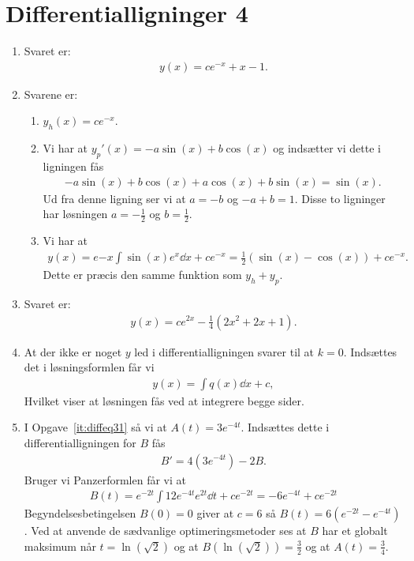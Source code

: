 \section{Differentialligninger 4}
\begin{enumerate}
	
	
	
	\item Svaret er:
	\begin{align*}
	y(x)=ce^{-x}+x-1.
	\end{align*}

	
	\item Svarene er:
	\begin{enumerate}
		\item $y_h(x)=ce^{-x}$.
		\item Vi har at $y_p'(x)=-a\sin(x)+b\cos(x)$ og indsætter vi dette i ligningen fås
		\begin{align*}
		-a\sin(x)+b\cos(x)+a\cos(x)+b\sin(x)=\sin(x).
		\end{align*} 
		Ud fra denne ligning ser vi at $a=-b$ og $-a+b=1$. Disse to ligninger har løsningen $a=-\frac{1}{2}$ og $b=\frac{1}{2}$.
		
		\item Vi har at 
		\begin{align*}
		y(x)=e{-x}\int \sin(x)e^x\dd x+ce^{-x}=\frac{1}{2}(\sin(x)-\cos(x))+ce^{-x}.
		\end{align*}
		Dette er præcis den samme funktion som $y_h+y_p$. 
	\end{enumerate}

	\item Svaret er:
	\begin{align*}
	y(x)=ce^{2x} -\frac{1}{4}(2x^2+2x+1).
	\end{align*}

	
	\item At der ikke er noget $y$ led i differentialligningen svarer til at $k=0$. Indsættes det i løsningsformlen får vi
	\begin{align*}
	y(x)=\int q(x)\dd x+ c,
	\end{align*}
	Hvilket viser at løsningen fås ved at integrere begge sider.
	
	
	
	\item I Opgave~\ref{it:diffeq31} så vi at $A(t)=3e^{-4t}$. Indsættes dette i differentialligningen for $B$ fås
	\begin{align*}
	B'=4(3e^{-4t})-2B.
	\end{align*}
	Bruger vi Panzerformlen får vi at
	\begin{align*}
	B(t)=e^{-2t} \int 12e^{-4t}e^{2t}\dd t +ce^{-2t}=-6e^{-4t}+ ce^{-2t}
	\end{align*}
	Begyndelsesbetingelsen $B(0)=0$ giver at $c=6$ så $B(t)=6(e^{-2t}-e^{-4t})$. Ved at anvende de sædvanlige optimeringsmetoder ses at $B$ har et globalt maksimum når $t=\ln(\sqrt{2})$ og at $B(\ln(\sqrt{2}))=\frac{3}{2}$ og at $A(t)=\frac{3}{4}$.
	

\end{enumerate}
